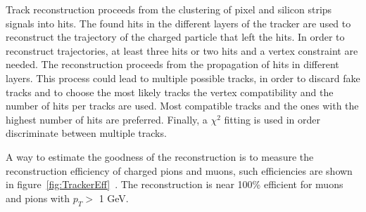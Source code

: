 Track reconstruction proceeds from the clustering of pixel and silicon strips signals into hits. The found hits in the different layers of the tracker are used to reconstruct the trajectory of the charged particle that left the hits. In order to reconstruct trajectories, at least three hits or two hits and a vertex constraint are needed. The reconstruction proceeds from the propagation of hits in different layers. This process could lead to multiple possible tracks, in order to discard fake tracks and to choose the most likely tracks the vertex compatibility and the number of hits per tracks are used. Most compatible tracks and the ones with the highest number of hits are preferred. Finally, a $\chi^{2}$ fitting is used in order discriminate between multiple tracks. 

A way to estimate the goodness of the reconstruction is to measure the reconstruction efficiency of charged pions and muons, such efficiencies are shown in figure~\ref{fig:TrackerEff}~\cite{Chatrchyan:2014fea}. The reconstruction is near 100\% efficient for muons and pions with $p_{T}>$ 1 GeV.


